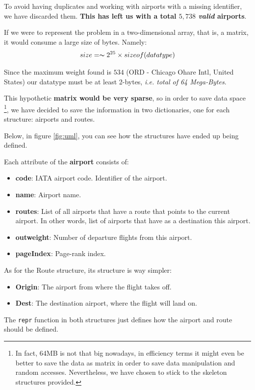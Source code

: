 \documentclass[10pt, a4paper]{article}
\begin{document}
To avoid having duplicates and working with airports with a missing identifier, we have discarded them. \textbf{This has left us  with a total $5,738$ \textit{valid} airports}. 

If we were to represent the problem in a two-dimensional array, that is, a matrix, it would consume a large size of bytes. Namely:  $$size = \thicksim 2^{25}\times sizeof(datatype)$$

Since the maximum weight found is $534$ (ORD - Chicago Ohare Intl, United States) our datatype must be at least 2-bytes, \textit{i.e. total of 64 Mega-Bytes}. 

This hypothetic \textbf{matrix would be very sparse}, so in order to save data space \footnote{In fact, 64MB is not that big nowadays, in efficiency terms it might even be better to save the data as matrix in order to save data manipulation and random accesses. Nevertheless, we have chosen to stick to the skeleton structures provided.}, we have decided to save the information in two dictionaries, one for each structure: airports and routes.

Below, in figure \ref{fig:uml}, you can see how the structures have ended up being defined. 


Each attribute of the \textbf{airport} consists of:
\begin{itemize}
    \item \textbf{code}: IATA airport code. Identifier of the airport.
    \item \textbf{name}: Airport name.
    \item \textbf{routes}: List of all airports that have a route that points to the current airport. In other words, list of airports that have as a destination this airport.
    \item \textbf{outweight}: Number of departure flights from this airport.
    \item \textbf{pageIndex}: Page-rank index.
\end{itemize}

As for the Route structure, its structure is way simpler:
\begin{itemize}
    \item \textbf{Origin}: The airport from where the flight takes off.
    \item \textbf{Dest}: The destination airport, where the flight will land on.
\end{itemize}


The \texttt{repr} function in both structures just defines how the airport and route should be defined.
\end{document}
